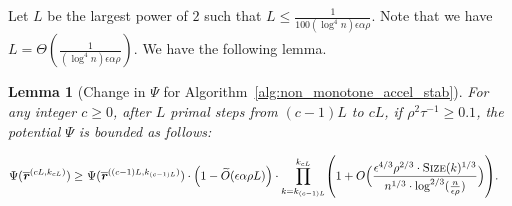 \documentclass[11pt]{article}
\newtheorem{lemma}[theorem]{Lemma}
\let\originalleft\left
\let\originalright\right
\renewcommand{\left}{\mathopen{}\mathclose\bgroup\originalleft}
\renewcommand{\right}{\aftergroup\egroup\originalright}
\newcommand\rr{\boldsymbol{\mathit{r}}}
\newcommand{\wt}{\widetilde}
\newcommand{\ov}{\overline}
\begin{document}
Let $L$ be the largest power of $2$ such that $L \leq \frac{1}{100 (\log^4 n) \epsilon \alpha \rho}$. Note that we have $L = \Theta(\frac{1}{(\log^4 n) \epsilon \alpha \rho})$. We have the following lemma.
\begin{lemma}[Change in $\Psi$ for Algorithm~\ref{alg:non_monotone_accel_stab}]\label{lem:ChangePsiStab}
For any integer $c \geq 0$, after $L$ primal steps from $(c-1)L$ to $cL$, if $\rho^2 \tau^{-1} \geq 0.1$, the potential $\Psi$ is bounded as follows:

\begin{align*}
\Psi(\ov{\rr}^{(cL,k_{cL})}) 
\geq &~ \Psi(\ov{\rr}^{((c-1)L,k_{(c-1)L})}) \cdot \Big(1 -  \wt{O}(\epsilon \alpha \rho L) \Big) \cdot \prod_{k=k_{(c-1)L}}^{k_{cL}} \left( 1 + O\Big(\frac{\epsilon^{4/3} \rho^{2/3} \cdot \textsc{Size}(k)^{1/3}}{n^{1/3} \cdot \log^{2/3}(\frac{n}{\epsilon \rho})}\Big) \right).
\end{align*}
\end{lemma}
\end{document}

